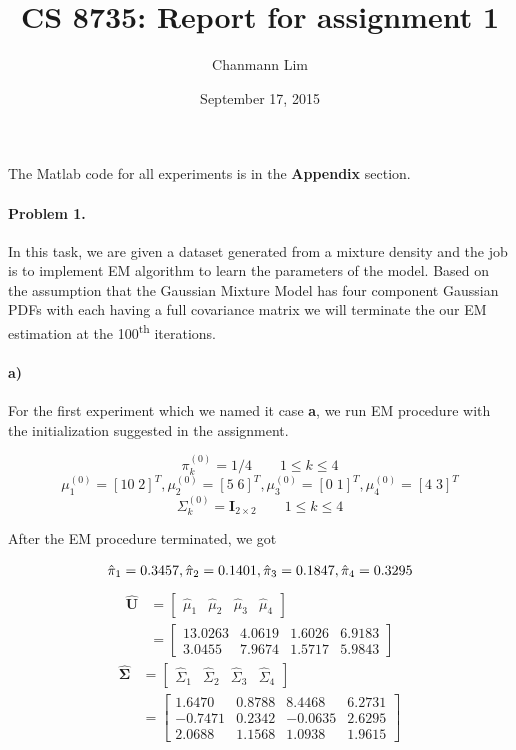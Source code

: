 \documentclass[a4paper]{article}
\begin{document}
\title{CS 8735: Report for assignment 1}
\author{Chanmann Lim}
\date{September 17, 2015}
\maketitle

\noindent The Matlab code for all experiments is in the \textbf{Appendix} section.

\paragraph{Problem 1.} In this task, we are given a dataset generated from a mixture density and the job is to implement EM algorithm to learn the parameters of the model. Based on the assumption that the Gaussian Mixture Model has four component Gaussian PDFs with each having a full covariance matrix we will terminate the our EM estimation at the 100\textsuperscript{th} iterations. \\

\paragraph{a) } For the first experiment which we named it case \textbf{a}, we run EM procedure with the initialization suggested in the assignment.

$$ \pi_k^{(0)} = 1/4 \qquad 1 \le k \le 4 $$
$$ \mu_1^{(0)} = [10\;2]^T, \mu_2^{(0)} = [5\;6]^T, \mu_3^{(0)} = [0\;1]^T, \mu_4^{(0)} = [4\;3]^T $$
$$ \Sigma_k^{(0)} = \mathbf{I}_{2\times2} \qquad 1 \le k \le 4 $$

After the EM procedure terminated, we got

\begin{equation}
	\hat{\pi}_1 = 0.3457, \hat{\pi}_2 = 0.1401, \hat{\pi}_3 = 0.1847, \hat{\pi}_4 = 0.3295\\
\end{equation}
\begin{align}
	\mathbf{\hat{U}} &= \begin{bmatrix}
							\hat{\mu}_1 & \hat{\mu}_2 & \hat{\mu}_3 & \hat{\mu}_4 
						\end{bmatrix} \\
					 & = \begin{bmatrix}
							13.0263  &  4.0619  &  1.6026  &  6.9183 \\
    						3.0455  &  7.9674  &  1.5717  &  5.9843
						 \end{bmatrix}
\end{align}
\begin{align}
	\mathbf{\hat{\Sigma}} &= \begin{bmatrix}
								\hat{\Sigma}_1 & \hat{\Sigma}_2 & \hat{\Sigma}_3 & \hat{\Sigma}_4 
							 \end{bmatrix} \\
						  & = \begin{bmatrix}
									1.6470  &  0.8788  &  8.4468  &  6.2731 \\
								   -0.7471  &  0.2342  & -0.0635  &  2.6295 \\
								    2.0688  &  1.1568  &  1.0938  &  1.9615
						 	  \end{bmatrix}
\end{align}
\end{document}
